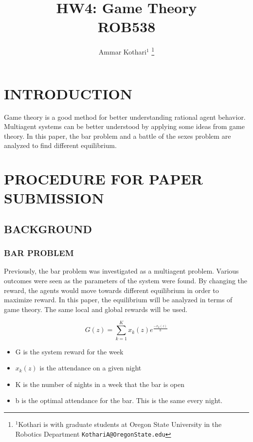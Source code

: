 \documentclass[letterpaper, 10 pt, conference]{ieeeconf}  %
\title{\LARGE \bf
HW4: Game Theory\\
ROB538
}
\author{Ammar Kothari$^{1}$%
\thanks{$^{1}$Kothari  is with graduate students at Oregon State University in the Robotics Department
        {\tt\small KothariA@OregonState.edu}}%
}
\begin{document}
\maketitle
\thispagestyle{empty}
\pagestyle{empty}



\section{INTRODUCTION}

Game theory is a good method for better understanding rational agent behavior.  Multiagent systems can be better understood by applying some ideas from game theory.  In this paper, the bar problem and a battle of the sexes problem are analyzed to find different equilibrium.

\section{PROCEDURE FOR PAPER SUBMISSION}

\subsection{BACKGROUND}
\subsubsection{BAR PROBLEM}
Previously, the bar problem was investigated as a multiagent problem.  Various outcomes were seen as the parameters of the system were found.  By changing the reward, the agents would move towards different equilibrium in order to maximize reward.  In this paper, the equilibrium will be analyzed in terms of game theory.  The same local and global rewards will be used.

\begin{equation}
    G(z) = \displaystyle\sum_{k=1}^{K} x_{k}(z)e^{\frac{-x_{k}(z)}{b}}
\end{equation}
\begin{itemize}
    \item G is the system reward for the week
    \item $x_{k}(z)$ is the attendance on a given night
    \item K is the number of nights in a week that the bar is open
    \item b is the optimal attendance for the bar.  This is the same every night.
\end{itemize}
\end{document}
